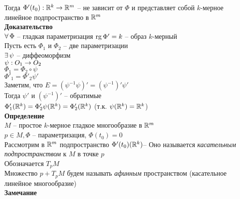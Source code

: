 \documentclass[12pt]{article}
\begin{document}
Тогда $\Phi'(t_0): \mathbb{R}^k \rightarrow \mathbb{R}^m$ -- не зависит от $\Phi$ и представляет собой $k$-мерное линейное подпространство в $\mathbb{R}^m$\\
\textbf{Доказательство}\\
$\forall\, \Phi$ -- гладкая параметризация $\operatorname{rg} \Phi' = k$ -- образ $k$-мерный\\
Пусть есть $\Phi_1$ и $\Phi_2$ -- две параметризации\\
$\exists\, \psi$ -- диффеоморфизм\\
$\psi: O_1 \rightarrow O_2$\\
$\Phi_1 = \Phi_2 \circ \psi$\\
$\Phi'_1 = \Phi'_2 \psi'$\\
Заметим, что $E = (\psi^{-1}\psi)' = (\psi^{-1})' \psi'$\\
Тогда $\psi'$ и $(\psi^{-1})'$ -- обратимые\\
$\Phi'_1(\mathbb{R}^k) = \Phi'_2\psi(\mathbb{R}^k) = \Phi'_2(\mathbb{R}^k)$ (т.к. $\psi(\mathbb{R}^k) = \mathbb{R}^k$)\\
\textbf{Определение}\\
$M$ -- простое $k$-мерное гладкое многообразие в $\mathbb{R}^m$\\
$p \in M, \Phi$ -- параметризация, $\Phi(t_0) = 0$\\
Рассмотрим в $\mathbb{R}^m$ подпространство $\Phi'(t_0)(\mathbb{R}^k)$--
Оно называется \textit{касательным подпространством} к $M$ в точке $p$\\
Обозначается $T_pM$\\
Множество $p+T_pM$ будем называть \textit{афинным} пространством (касательное линейное многообразие)\\
\textbf{Замечание}
\end{document}
